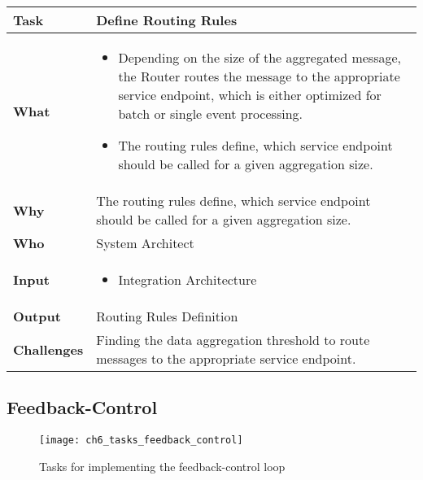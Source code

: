\begin{minipage}{\textwidth}
 \label{table:ch6_Task_Define_Routing_Rules}
\begin{tabular}
	{|m{3cm}|m{10cm}|} \hline \bfseries Task & Define Routing Rules\\
	\hline \bfseries What & 
	\begin{itemize}
		\item Depending on the size of the aggregated message, the Router routes the message to the appropriate service endpoint, which is either optimized for batch or single event processing.
		\item The routing rules define, which service endpoint should be called for a given aggregation size.
	\end{itemize}
	\\
	\hline \bfseries Why & The routing rules define, which service endpoint should be called for a given aggregation size.\\
	\hline \bfseries Who & System Architect\\
	\hline \bfseries Input & 
		\begin{itemize}
			\item Integration Architecture
		\end{itemize}
	\\
	\hline \bfseries Output & Routing Rules Definition\\
	\hline \bfseries Challenges & Finding the data aggregation threshold to route messages to the appropriate service endpoint.\\
	\hline 
\end{tabular}
\end{minipage}

\subsection{Feedback-Control}

\begin{figure}[htpb] \centering 
	\texttt{[image: ch6\_tasks\_feedback\_control]} 
	\caption{Tasks for implementing the feedback-control loop} 
	\label{fig:ch6_tasks_feedback_control} 
\end{figure}

